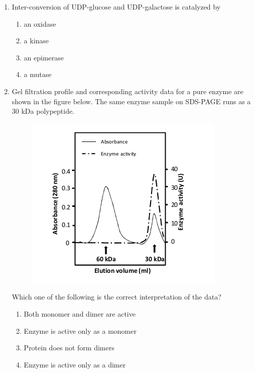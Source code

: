 \documentclass[journal,12pt,onecolumn]{IEEEtran}
\begin{document}
\begin{enumerate}[label=\arabic*.]
\item Inter-conversion of UDP-glucose and UDP-galactose is catalyzed by

\begin{multicols}{4}
\begin{enumerate}[label=(\Alph*)]
\item an oxidase
\item a kinase
\item an epimerase
\item a mutase
\end{enumerate}
\end{multicols}

\item Gel filtration profile and corresponding activity data for a pure enzyme are shown in the figure below. The same enzyme sample on SDS-PAGE runs as a 30 kDa polypeptide.

\begin{figure}[H]
\centering
\includegraphics[width=0.7\columnwidth]{FIG/I-5.png}
\caption*{}
\label{fig:I-5}
\end{figure}

Which one of the following is the correct interpretation of the data?

\begin{multicols}{2}
\begin{enumerate}[label=(\Alph*)]
\item Both monomer and dimer are active
\item Enzyme is active only as a monomer
\item Protein does not form dimers
\item Enzyme is active only as a dimer
\end{enumerate}
\end{multicols}


\end{enumerate}
\end{document}

